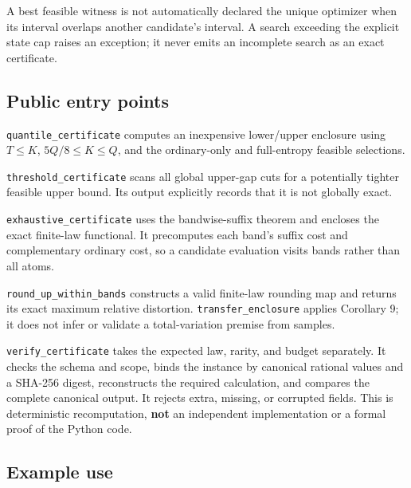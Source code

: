 \documentclass[
  11pt,
  a4paper,
]{article}
\begin{document}
A best feasible witness is not automatically declared the unique
optimizer when its interval overlaps another candidate's interval. A
search exceeding the explicit state cap raises an exception; it never
emits an incomplete search as an exact certificate.

\subsection{Public entry points}\label{public-entry-points}

\texttt{quantile\_certificate} computes an inexpensive lower/upper
enclosure using \(T\le K\), \(5Q/8\le K\le Q\), and the ordinary-only
and full-entropy feasible selections.

\texttt{threshold\_certificate} scans all global upper-gap cuts for a
potentially tighter feasible upper bound. Its output explicitly records
that it is not globally exact.

\texttt{exhaustive\_certificate} uses the bandwise-suffix theorem and
encloses the exact finite-law functional. It precomputes each band's
suffix cost and complementary ordinary cost, so a candidate evaluation
visits bands rather than all atoms.

\texttt{round\_up\_within\_bands} constructs a valid finite-law rounding
map and returns its exact maximum relative distortion.
\texttt{transfer\_enclosure} applies Corollary 9; it does not infer or
validate a total-variation premise from samples.

\texttt{verify\_certificate} takes the expected law, rarity, and budget
separately. It checks the schema and scope, binds the instance by
canonical rational values and a SHA-256 digest, reconstructs the
required calculation, and compares the complete canonical output. It
rejects extra, missing, or corrupted fields. This is deterministic
recomputation, \textbf{not} an independent implementation or a formal
proof of the Python code.

\subsection{Example use}\label{example-use}
\end{document}
